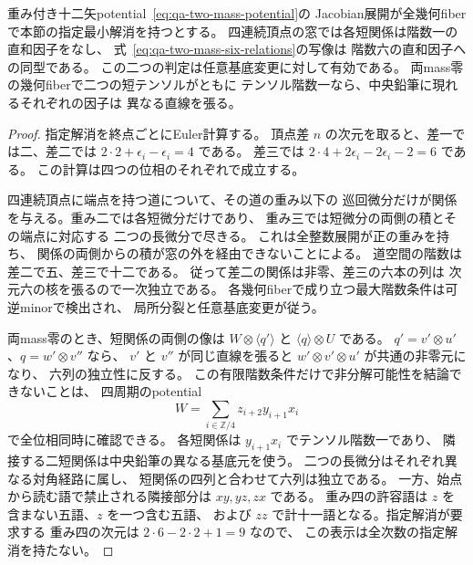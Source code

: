 \begin{proposition}[指定最小解消が強制する有限関係の階数]
\label{prop:qa-avatar-as-forces-finite-ranks}
重み付き十二矢potential~\eqref{eq:qa-two-mass-potential}の
Jacobian展開が全幾何fiberで本節の指定最小解消を持つとする。
四連続頂点の窓では各短関係は階数一の直和因子をなし、
式~\eqref{eq:qa-two-mass-six-relations}の写像は
階数六の直和因子への同型である。
この二つの判定は任意基底変更に対して有効である。
両mass零の幾何fiberで二つの短テンソルがともに
テンソル階数一なら、中央鉛筆に現れるそれぞれの因子は
異なる直線を張る。
\end{proposition}
\begin{proof}
指定解消を終点ごとにEuler計算する。
頂点差 $n$ の次元を取ると、差一では二、差二では
$2\cdot2+\epsilon_i-\epsilon_i=4$ である。
差三では
$2\cdot4+2\epsilon_i-2\epsilon_i-2=6$ である。
この計算は四つの位相のそれぞれで成立する。

四連続頂点に端点を持つ道について、その道の重み以下の
巡回微分だけが関係を与える。重み二では各短微分だけであり、
重み三では短微分の両側の積とその端点に対応する
二つの長微分で尽きる。
これは全整数展開が正の重みを持ち、
関係の両側からの積が窓の外を経由できないことによる。
道空間の階数は差二で五、差三で十二である。
従って差二の関係は非零、差三の六本の列は
次元六の核を張るので一次独立である。
各幾何fiberで成り立つ最大階数条件は可逆minorで検出され、
局所分裂と任意基底変更が従う。

両mass零のとき、短関係の両側の像は
$W\otimes\langle q'\rangle$ と
$\langle q\rangle\otimes U$ である。
$q'=v'\otimes u'$、$q=w'\otimes v''$ なら、
$v'$ と $v''$ が同じ直線を張ると
$w'\otimes v'\otimes u'$ が共通の非零元になり、
六列の独立性に反する。
この有限階数条件だけで非分解可能性を結論できないことは、
四周期のpotential
\[
 W=\sum_{i\in\mathbb Z/4} z_{i+2}y_{i+1}x_i
\]
で全位相同時に確認できる。
各短関係は $y_{i+1}x_i$ でテンソル階数一であり、
隣接する二短関係は中央鉛筆の異なる基底元を使う。
二つの長微分はそれぞれ異なる対角経路に属し、
短関係の四列と合わせて六列は独立である。
一方、始点から読む語で禁止される隣接部分は $xy,yz,zx$ である。
重み四の許容語は $z$ を含まない五語、$z$ を一つ含む五語、
および $zz$ で計十一語となる。指定解消が要求する
重み四の次元は $2\cdot6-2\cdot2+1=9$ なので、
この表示は全次数の指定解消を持たない。
\end{proof}

